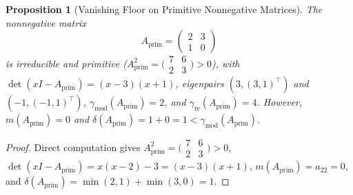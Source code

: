 \documentclass[11pt]{article}
\newtheorem{proposition}[theorem]{Proposition}
\theoremstyle{definition}
\begin{document}
\begin{proposition}[Vanishing Floor on Primitive Nonnegative Matrices]\label{prop:prim-zero}
The nonnegative matrix
\[
  A_{\mathrm{prim}} = \begin{pmatrix} 2 & 3 \\ 1 & 0 \end{pmatrix}
\]
is irreducible and primitive ($A_{\mathrm{prim}}^2 = \bigl(\begin{smallmatrix} 7 & 6 \\ 2 & 3 \end{smallmatrix}\bigr) > 0$), with $\det(x I - A_{\mathrm{prim}}) = (x - 3)(x + 1)$, eigenpairs $(3, (3, 1)^\top)$ and $(-1, (-1, 1)^\top)$, $\gamma_{\mathrm{mod}}(A_{\mathrm{prim}}) = 2$, and $\gamma_{\mathrm{re}}(A_{\mathrm{prim}}) = 4$. However, $m(A_{\mathrm{prim}}) = 0$ and $\delta(A_{\mathrm{prim}}) = 1 + 0 = 1 < \gamma_{\mathrm{mod}}(A_{\mathrm{prim}})$.
\end{proposition}

\begin{proof}
Direct computation gives $A_{\mathrm{prim}}^2 = \bigl(\begin{smallmatrix} 7 & 6 \\ 2 & 3 \end{smallmatrix}\bigr) > 0$, $\det(x I - A_{\mathrm{prim}}) = x(x - 2) - 3 = (x - 3)(x + 1)$, $m(A_{\mathrm{prim}}) = a_{22} = 0$, and $\delta(A_{\mathrm{prim}}) = \min(2,1) + \min(3,0) = 1$.
\end{proof}
\end{document}
